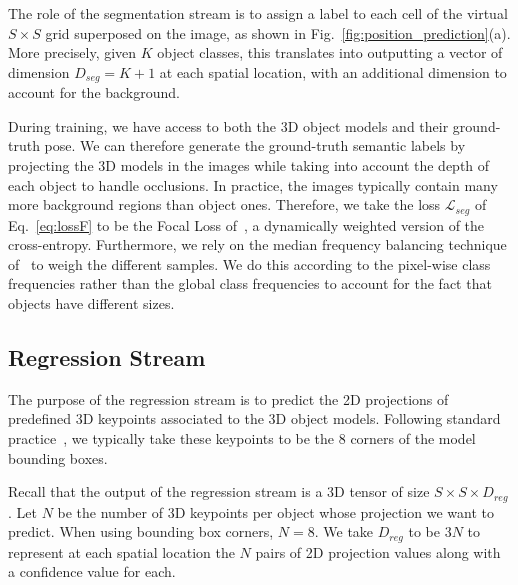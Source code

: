 \documentclass[10pt,twocolumn,letterpaper]{article}
\begin{document}
The role of the segmentation stream is to assign a label to each cell of the virtual $S \times S$ grid superposed on the image, as shown in Fig.~\ref{fig:position_prediction}(a). 
More precisely, given $K$ object classes, this translates into outputting a vector of dimension $D_{seg} = K+1$ at each spatial location, with an additional dimension to account for the background.

During training, we have access to both the 3D object models and their ground-truth pose. We can therefore generate the ground-truth semantic labels by projecting the 3D models in the images while taking into account the depth of each object to handle occlusions. In practice, the images typically contain many more background regions than object ones. Therefore, we take the loss ${\mathcal L}_{seg}$ of Eq.~\ref{eq:lossF} to be the Focal Loss of~\cite{Lin17}, a dynamically weighted version of the cross-entropy. Furthermore, we rely on the median frequency balancing technique of~\cite{Eigen15,Badrinarayanan15} to weigh the different samples. We do this according to the pixel-wise class frequencies rather than the global class frequencies to account for the fact that objects have different sizes.

\subsection{Regression Stream}
\label{sec:reg}

The purpose of the regression stream is to predict the 2D projections of predefined 3D keypoints associated to the 3D object models. Following standard practice~\cite{Rad17,Grabner18,Rad18}, we typically take these keypoints to be the 8 corners of the model bounding boxes. 

Recall that the output of the regression stream is a 3D tensor of size $S \times S \times D_{reg}$. Let $N$ be the number of 3D keypoints per object whose projection we want to predict. When using bounding box corners, $N=8$.
We take $D_{reg}$ to be $3N$ to represent at each spatial location the $N$ pairs of 2D projection values along with a confidence value for each. 
\end{document}
